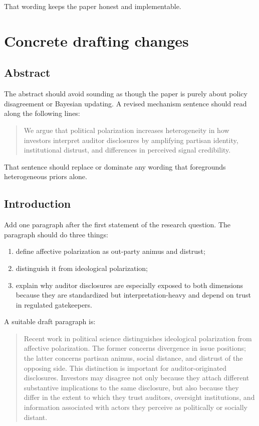 \documentclass[12pt]{article}
\begin{document}
That wording keeps the paper honest and implementable.

\section{Concrete drafting changes}

\subsection{Abstract}

The abstract should avoid sounding as though the paper is purely about policy disagreement or Bayesian updating. A revised mechanism sentence should read along the following lines:

\begin{quote}
We argue that political polarization increases heterogeneity in how investors interpret auditor disclosures by amplifying partisan identity, institutional distrust, and differences in perceived signal credibility.
\end{quote}

That sentence should replace or dominate any wording that foregrounds heterogeneous priors alone.

\subsection{Introduction}

Add one paragraph after the first statement of the research question. The paragraph should do three things:
\begin{enumerate}
    \item define affective polarization as out-party animus and distrust;
    \item distinguish it from ideological polarization;
    \item explain why auditor disclosures are especially exposed to both dimensions because they are standardized but interpretation-heavy and depend on trust in regulated gatekeepers.
\end{enumerate}

A suitable draft paragraph is:

\begin{quote}
Recent work in political science distinguishes ideological polarization from affective polarization. The former concerns divergence in issue positions; the latter concerns partisan animus, social distance, and distrust of the opposing side. This distinction is important for auditor-originated disclosures. Investors may disagree not only because they attach different substantive implications to the same disclosure, but also because they differ in the extent to which they trust auditors, oversight institutions, and information associated with actors they perceive as politically or socially distant.
\end{quote}
\end{document}
